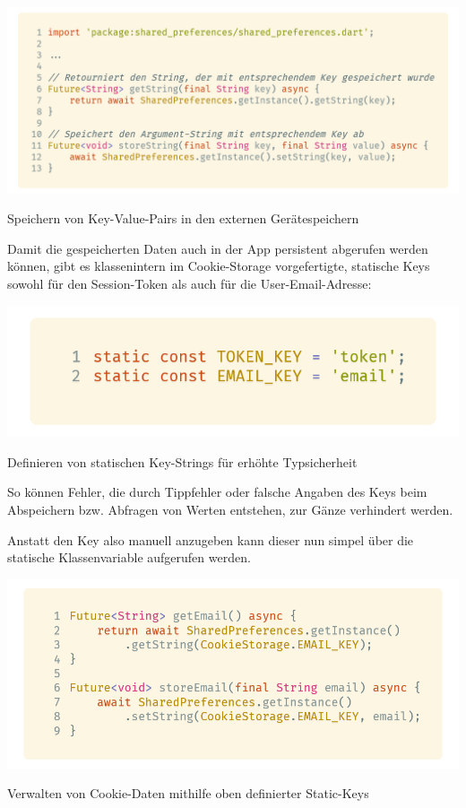 \begin{code}
    \centering
    \includegraphics[width=1\textwidth]{images/Dart/util/cookie-storage/sharedPreferences.png}
    \caption{Speichern von Key-Value-Pairs in den externen Gerätespeichern}
\end{code}

Damit die gespeicherten Daten auch in der App persistent abgerufen werden können, gibt es klassenintern
im Cookie-Storage vorgefertigte, statische Keys sowohl für den Session-Token als auch für die User-Email-Adresse:

\begin{code}
    \centering
    \includegraphics[width=1\textwidth]{images/Dart/util/cookie-storage/cookieKeys.png}
    \caption{Definieren von statischen Key-Strings für erhöhte Typsicherheit}
\end{code}

So können Fehler, die durch Tippfehler oder falsche Angaben des Keys beim Abspeichern bzw. Abfragen
von Werten entstehen, zur Gänze verhindert werden.

Anstatt den Key also manuell anzugeben kann dieser nun simpel über die statische Klassenvariable
aufgerufen werden.

\begin{code}
    \centering
    \includegraphics[width=1\textwidth]{images/Dart/util/cookie-storage/getAndStoreWithStaticKey.png}
    \caption{Verwalten von Cookie-Daten mithilfe oben definierter Static-Keys}
\end{code}